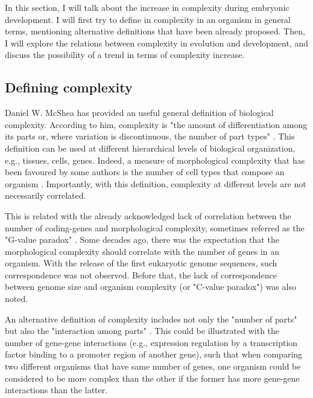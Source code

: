 In this section, I will talk about the increase in complexity during embryonic development.
I will first try to define in complexity in an organism in general terms, mentioning alternative definitions that have been already proposed.
Then, I will explore the relations between complexity in evolution and development, and discuss the possibility of a trend in terms of complexity increase.


\subsection{Defining complexity}
Daniel W. McShea has provided an useful general definition of biological complexity. According to him, complexity is "the amount of differentiation among its parts or, where variation is discontinuous, the number of part types" \citep{McShea1996,McShea2015}.
This definition can be used at different hierarchical levels of biological organization, e.g., tissues, cells, genes.
Indeed, a measure of morphological complexity that has been favoured by some authors 
is the number of cell types that compose an organism 
	\citep{Bell1997,Bonner2004,McShea1996}.
Importantly, with this definition, complexity at different levels are not necessarily correlated.


This is related with the already acknowledged lack of correlation between the number of coding-genes and morphological complexity, 
sometimes referred as the "G-value paradox"
	\citep{Hahn2002}.
Some decades ago, there was the expectation that the morphological complexity should correlate with the number of genes in an organism. 
With the release of the first eukaryotic genome sequences, such correspondence was not observed.
Before that, the lack of correspondence between genome size and organism complexity (or "C-value paradox") was also noted.

An alternative definition of complexity includes not only the "number of parts" but also the "interaction among parts" 
	\citep{McShea1996,Arthur2010}.
This could be illustrated with the number of gene-gene interactions (e.g., expression regulation by a transcription factor binding to a promoter region of another gene),
such that when comparing two different organisms that have same number of genes, 
one organism could be considered to be more complex than the other if the former has more gene-gene interactions than the latter.

